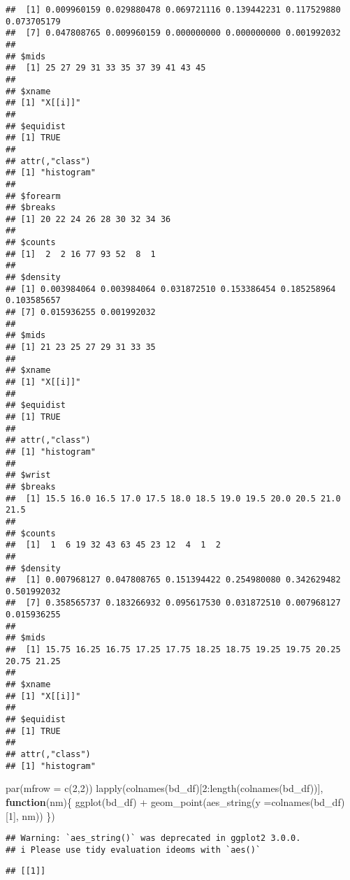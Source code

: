 \documentclass[
]{article}
\newenvironment{Shaded}{\begin{snugshade}}{\end{snugshade}}
\newcommand{\AttributeTok}[1]{\textcolor[rgb]{0.77,0.63,0.00}{#1}}
\newcommand{\ControlFlowTok}[1]{\textcolor[rgb]{0.13,0.29,0.53}{\textbf{#1}}}
\newcommand{\DecValTok}[1]{\textcolor[rgb]{0.00,0.00,0.81}{#1}}
\newcommand{\FunctionTok}[1]{\textcolor[rgb]{0.00,0.00,0.00}{#1}}
\newcommand{\NormalTok}[1]{#1}
\newcommand{\SpecialCharTok}[1]{\textcolor[rgb]{0.00,0.00,0.00}{#1}}
\begin{document}
\begin{verbatim}
##  [1] 0.009960159 0.029880478 0.069721116 0.139442231 0.117529880 0.073705179
##  [7] 0.047808765 0.009960159 0.000000000 0.000000000 0.001992032
## 
## $mids
##  [1] 25 27 29 31 33 35 37 39 41 43 45
## 
## $xname
## [1] "X[[i]]"
## 
## $equidist
## [1] TRUE
## 
## attr(,"class")
## [1] "histogram"
## 
## $forearm
## $breaks
## [1] 20 22 24 26 28 30 32 34 36
## 
## $counts
## [1]  2  2 16 77 93 52  8  1
## 
## $density
## [1] 0.003984064 0.003984064 0.031872510 0.153386454 0.185258964 0.103585657
## [7] 0.015936255 0.001992032
## 
## $mids
## [1] 21 23 25 27 29 31 33 35
## 
## $xname
## [1] "X[[i]]"
## 
## $equidist
## [1] TRUE
## 
## attr(,"class")
## [1] "histogram"
## 
## $wrist
## $breaks
##  [1] 15.5 16.0 16.5 17.0 17.5 18.0 18.5 19.0 19.5 20.0 20.5 21.0 21.5
## 
## $counts
##  [1]  1  6 19 32 43 63 45 23 12  4  1  2
## 
## $density
##  [1] 0.007968127 0.047808765 0.151394422 0.254980080 0.342629482 0.501992032
##  [7] 0.358565737 0.183266932 0.095617530 0.031872510 0.007968127 0.015936255
## 
## $mids
##  [1] 15.75 16.25 16.75 17.25 17.75 18.25 18.75 19.25 19.75 20.25 20.75 21.25
## 
## $xname
## [1] "X[[i]]"
## 
## $equidist
## [1] TRUE
## 
## attr(,"class")
## [1] "histogram"
\end{verbatim}

\begin{Shaded}
\begin{Highlighting}[]
\FunctionTok{par}\NormalTok{(}\AttributeTok{mfrow =} \FunctionTok{c}\NormalTok{(}\DecValTok{2}\NormalTok{,}\DecValTok{2}\NormalTok{))}
\FunctionTok{lapply}\NormalTok{(}\FunctionTok{colnames}\NormalTok{(bd\_df)[}\DecValTok{2}\SpecialCharTok{:}\FunctionTok{length}\NormalTok{(}\FunctionTok{colnames}\NormalTok{(bd\_df))], }\ControlFlowTok{function}\NormalTok{(nm)\{}
  \FunctionTok{ggplot}\NormalTok{(bd\_df) }\SpecialCharTok{+}
    \FunctionTok{geom\_point}\NormalTok{(}\FunctionTok{aes\_string}\NormalTok{(}\AttributeTok{y =}\FunctionTok{colnames}\NormalTok{(bd\_df)[}\DecValTok{1}\NormalTok{],}
\NormalTok{                          nm))}
\NormalTok{\})}
\end{Highlighting}
\end{Shaded}

\begin{verbatim}
## Warning: `aes_string()` was deprecated in ggplot2 3.0.0.
## i Please use tidy evaluation ideoms with `aes()`
\end{verbatim}

\begin{verbatim}
## [[1]]
\end{verbatim}
\end{document}
